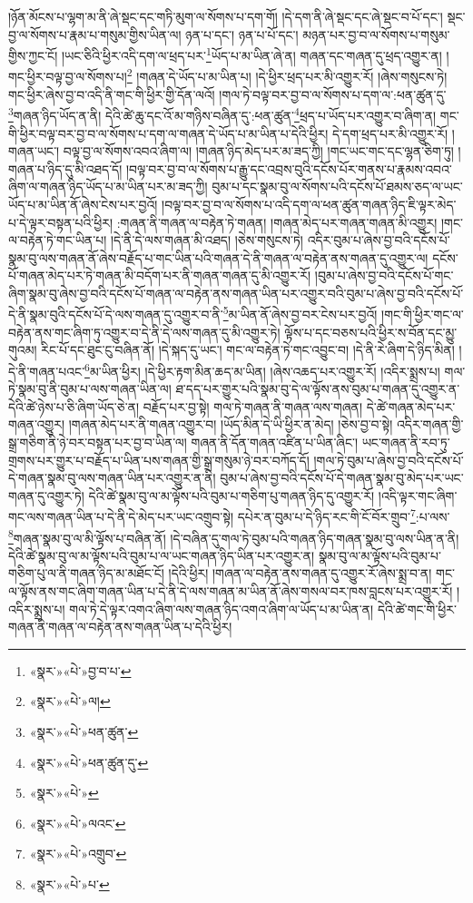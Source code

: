 །ཉོན་མོངས་པ་ལྷག་མ་ནི་ཞེ་སྡང་དང་གཏི་མུག་ལ་སོགས་པ་དག་གོ། །དེ་དག་ནི་ཞེ་སྡང་དང་ཞེ་སྡང་བ་པོ་དང་། སྡང་བྱ་ལ་སོགས་པ་རྣམ་པ་གསུམ་གྱིས་ཡིན་ལ། ཉན་པ་དང་། ཉན་པ་པོ་དང་། མཉན་པར་བྱ་བ་ལ་སོགས་པ་གསུམ་གྱིས་ཀྱང་ངོ། །ཡང་ཅིའི་ཕྱིར་འདི་དག་ལ་ཕྲད་པར་\footnote{«སྣར་»«པེ་»བྱ་བ་པ་}ཡོད་པ་མ་ཡིན་ཞེ་ན། གཞན་དང་གཞན་དུ་ཕྲད་འགྱུར་ན། །
གང་ཕྱིར་བལྟ་བྱ་ལ་སོགས་པ།\footnote{«སྣར་»«པེ་»ལ།} །གཞན་དེ་ཡོད་པ་མ་ཡིན་པ། །དེ་ཕྱིར་ཕྲད་པར་མི་འགྱུར་རོ། །ཞེས་གསུངས་ཏེ། གང་ཕྱིར་ཞེས་བྱ་བ་འདི་ནི་གང་གི་ཕྱིར་གྱི་དོན་ལའོ། །གལ་ཏེ་བལྟ་བར་བྱ་བ་ལ་སོགས་པ་དག་ལ་:ཕན་ཚུན་དུ་\footnote{«སྣར་»«པེ་»ཕན་ཚུན་}གཞན་ཉིད་ཡོད་ན་ནི། དེའི་ཚེ་ཆུ་དང་འོ་མ་གཉིས་བཞིན་དུ་:ཕན་ཚུན་\footnote{«སྣར་»«པེ་»ཕན་ཚུན་དུ་}ཕྲད་པ་ཡོད་པར་འགྱུར་བ་ཞིག་ན། གང་གི་ཕྱིར་བལྟ་བར་བྱ་བ་ལ་སོགས་པ་དག་ལ་གཞན་དེ་ཡོད་པ་མ་ཡིན་པ་དེའི་ཕྱིར། དེ་དག་ཕྲད་པར་མི་འགྱུར་རོ། །གཞན་ཡང་། བལྟ་བྱ་ལ་སོགས་འབའ་ཞིག་ལ། །གཞན་ཉིད་མེད་པར་མ་ཟད་ཀྱི། །གང་ཡང་གང་དང་ལྷན་ཅིག་ཏུ། །གཞན་པ་ཉིད་དུ་མི་འཐད་དོ། །བལྟ་བར་བྱ་བ་ལ་སོགས་པ་རྒྱུ་དང་འབྲས་བུའི་དངོས་པོར་གནས་པ་རྣམས་འབའ་ཞིག་ལ་གཞན་ཉིད་ཡོད་པ་མ་ཡིན་པར་མ་ཟད་ཀྱི། བུམ་པ་དང་སྣམ་བུ་ལ་སོགས་པའི་དངོས་པོ་ཐམས་ཅད་ལ་ཡང་ཡོད་པ་མ་ཡིན་ནོ་ཞེས་ངེས་པར་བྱའོ། །བལྟ་བར་བྱ་བ་ལ་སོགས་པ་འདི་དག་ལ་ཕན་ཚུན་གཞན་ཉིད་ཇི་ལྟར་མེད་པ་དེ་ལྟར་བསྟན་པའི་ཕྱིར། :གཞན་ནི་གཞན་ལ་བརྟེན་ཏེ་གཞན། །གཞན་མེད་པར་གཞན་གཞན་མི་འགྱུར། །གང་ལ་བརྟེན་ཏེ་གང་ཡིན་པ། །དེ་ནི་དེ་ལས་གཞན་མི་འཐད། །ཅེས་གསུངས་ཏེ། འདིར་བུམ་པ་ཞེས་བྱ་བའི་དངོས་པོ་སྣམ་བུ་ལས་གཞན་ནོ་ཞེས་བརྗོད་པ་གང་ཡིན་པའི་གཞན་དེ་ནི་གཞན་ལ་བརྟེན་ནས་གཞན་དུ་འགྱུར་ལ། དངོས་པོ་གཞན་མེད་པར་ཏེ་གཞན་མི་བདོག་པར་ནི་གཞན་གཞན་དུ་མི་འགྱུར་རོ། །བུམ་པ་ཞེས་བྱ་བའི་དངོས་པོ་གང་ཞིག་སྣམ་བུ་ཞེས་བྱ་བའི་དངོས་པོ་གཞན་ལ་བརྟེན་ནས་གཞན་ཡིན་པར་འགྱུར་བའི་བུམ་པ་ཞེས་བྱ་བའི་དངོས་པོ་དེ་ནི་སྣམ་བུའི་དངོས་པོ་དེ་ལས་གཞན་དུ་འགྱུར་བ་ནི་\footnote{«སྣར་»«པེ་»}མ་ཡིན་ནོ་ཞེས་བྱ་བར་ངེས་པར་བྱའོ། །གང་གི་ཕྱིར་གང་ལ་བརྟེན་ནས་གང་ཞིག་ཏུ་འགྱུར་བ་དེ་ནི་དེ་ལས་གཞན་དུ་མི་འགྱུར་ཏེ། ལྟོས་པ་དང་བཅས་པའི་ཕྱིར་ས་བོན་དང་མྱུ་གུའམ། རིང་པོ་དང་ཐུང་ངུ་བཞིན་ནོ། །དེ་སྐད་དུ་ཡང་། གང་ལ་བརྟེན་ཏེ་གང་འབྱུང་བ། །དེ་ནི་རེ་ཞིག་དེ་ཉིད་མིན། །དེ་ནི་གཞན་པའང་\footnote{«སྣར་»«པེ་»ལའང་}མ་ཡིན་ཕྱིར། །དེ་ཕྱིར་རྟག་མིན་ཆད་མ་ཡིན། །ཞེས་འཆད་པར་འགྱུར་རོ། །འདིར་སྨྲས་པ། གལ་ཏེ་སྣམ་བུ་ནི་བུམ་པ་ལས་གཞན་ཡིན་ལ། ཐ་དད་པར་གྱུར་པའི་སྣམ་བུ་དེ་ལ་ལྟོས་ནས་བུམ་པ་གཞན་དུ་འགྱུར་ན་དེའི་ཚེ་ཉེས་པ་ཅི་ཞིག་ཡོད་ཅེ་ན། བརྗོད་པར་བྱ་སྟེ། གལ་ཏེ་གཞན་ནི་གཞན་ལས་གཞན། དེ་ཚེ་གཞན་མེད་པར་གཞན་འགྱུར། །གཞན་མེད་པར་ནི་གཞན་འགྱུར་བ། །ཡོད་མིན་དེ་ཡི་ཕྱིར་ན་མེད། །ཅེས་བྱ་བ་སྟེ། འདིར་གཞན་གྱི་སྒྲ་གཅིག་ནི་ཉེ་བར་བསྟན་པར་བྱ་བ་ཡིན་ལ། གཞན་ནི་དོན་གཞན་འཛིན་པ་ཡིན་ཞིང་། ཡང་གཞན་ནི་རབ་ཏུ་གྲགས་པར་གྱུར་པ་བརྗོད་པ་ཡིན་པས་གཞན་གྱི་སྒྲ་གསུམ་ཉེ་བར་བཀོད་དོ། །གལ་ཏེ་བུམ་པ་ཞེས་བྱ་བའི་དངོས་པོ་དེ་གཞན་སྣམ་བུ་ལས་གཞན་ཡིན་པར་འགྱུར་ན་ནི། བུམ་པ་ཞེས་བྱ་བའི་དངོས་པོ་དེ་གཞན་སྣམ་བུ་མེད་པར་ཡང་གཞན་དུ་འགྱུར་ཏེ། དེའི་ཚེ་སྣམ་བུ་ལ་མ་ལྟོས་པའི་བུམ་པ་གཅིག་པུ་གཞན་ཉིད་དུ་འགྱུར་རོ། །འདི་ལྟར་གང་ཞིག་གང་ལས་གཞན་ཡིན་པ་དེ་ནི་དེ་མེད་པར་ཡང་འགྲུབ་སྟེ། དཔེར་ན་བུམ་པ་དེ་ཉིད་རང་གི་ངོ་བོར་གྲུབ་\footnote{«སྣར་»«པེ་»འགྲུབ་}:པ་ལས་\footnote{«སྣར་»«པེ་»པ་}གཞན་སྣམ་བུ་ལ་མི་ལྟོས་པ་བཞིན་ནོ། །དེ་བཞིན་དུ་གལ་ཏེ་བུམ་པའི་གཞན་ཉིད་གཞན་སྣམ་བུ་ལས་ཡིན་ན་ནི། དེའི་ཚེ་སྣམ་བུ་ལ་མ་ལྟོས་པའི་བུམ་པ་ལ་ཡང་གཞན་ཉིད་ཡིན་པར་འགྱུར་ན། སྣམ་བུ་ལ་མ་ལྟོས་པའི་བུམ་པ་གཅིག་པུ་ལ་ནི་གཞན་ཉིད་མ་མཐོང་ངོ། །དེའི་ཕྱིར། །གཞན་ལ་བརྟེན་ནས་གཞན་དུ་འགྱུར་རོ་ཞེས་སྨྲ་བ་ན། གང་ལ་ལྟོས་ནས་གང་ཞིག་གཞན་ཡིན་པ་དེ་ནི་དེ་ལས་གཞན་མ་ཡིན་ནོ་ཞེས་གསལ་བར་ཁས་བླངས་པར་འགྱུར་རོ། །འདིར་སྨྲས་པ། གལ་ཏེ་དེ་ལྟར་འགའ་ཞིག་ལས་གཞན་ཉིད་འགའ་ཞིག་ལ་ཡོད་པ་མ་ཡིན་ན། དེའི་ཚེ་གང་གི་ཕྱིར་གཞན་ནི་གཞན་ལ་བརྟེན་ནས་གཞན་ཡིན་པ་དེའི་ཕྱིར། 